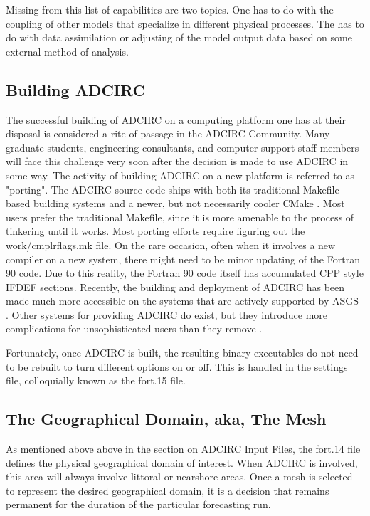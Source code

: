 \documentclass{article}
\begin{document}
Missing from this list of capabilities are two topics. One has to do with the
coupling of other models that specialize in different physical processes. The
has to do with data assimilation or adjusting of the model output data based on
some external method of analysis.

\subsection{Building ADCIRC}

The successful building of ADCIRC on a computing platform one has at their
disposal is considered a rite of passage in the ADCIRC Community. Many graduate
students, engineering consultants, and computer support staff members will face
this challenge very soon after the decision is made to use ADCIRC in some way.
The activity of building ADCIRC on a new platform is referred to as "porting".
The ADCIRC source code ships with both its traditional Makefile-based \cite{adcirc}
building systems and a newer, but not necessarily cooler CMake \cite{adcirc}. Most
users prefer the traditional Makefile, since it is more amenable to the process
of tinkering until it works. Most porting efforts require figuring out the
work/cmplrflags.mk file. On the rare occasion, often when it involves a new
compiler on a new system, there might need to be minor updating of the Fortran
90 code. Due to this reality, the Fortran 90 code itself has accumulated CPP
style IFDEF sections.  Recently, the building and deployment of ADCIRC has been
made much more accessible on the systems that are actively supported by ASGS
\cite{asgs}. Other systems for providing ADCIRC do exist, but they introduce
more complications for unsophisticated users than they remove \cite{adcircspack}.

Fortunately, once ADCIRC is built, the resulting binary executables do not need
to be rebuilt to turn different options on or off. This is handled in the
settings file, colloquially known as the fort.15 file.

\subsection{The Geographical Domain, aka, The Mesh}

As mentioned above above in the section on ADCIRC Input Files, the fort.14 file
defines the physical geographical domain of interest. When ADCIRC is involved,
this area will always involve littoral or nearshore areas. Once a mesh is
selected to represent the desired geographical domain, it is a decision that
remains permanent for the duration of the particular forecasting run.
\end{document}
